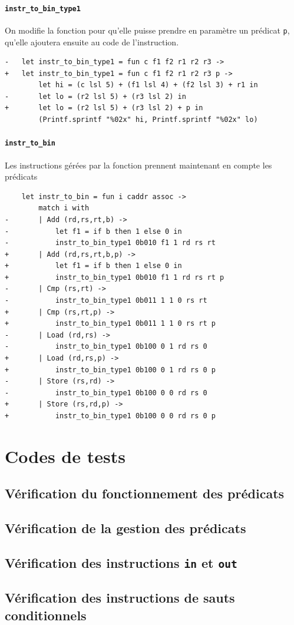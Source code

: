 \documentclass[11pt, a4paper, twoside, titlepage]{article}
\begin{document}
\paragraph{\texttt{instr\_to\_bin\_type1}}
On modifie la fonction pour qu'elle puisse prendre en paramètre un prédicat \texttt{p}, qu'elle ajoutera ensuite au code de l'instruction.
\begin{lstlisting}
-	let instr_to_bin_type1 = fun c f1 f2 r1 r2 r3 ->
+	let instr_to_bin_type1 = fun c f1 f2 r1 r2 r3 p ->
		let hi = (c lsl 5) + (f1 lsl 4) + (f2 lsl 3) + r1 in
-		let lo = (r2 lsl 5) + (r3 lsl 2) in
+		let lo = (r2 lsl 5) + (r3 lsl 2) + p in
		(Printf.sprintf "%02x" hi, Printf.sprintf "%02x" lo)
\end{lstlisting}
\paragraph{\texttt{instr\_to\_bin}}
Les instructions gérées par la fonction prennent maintenant en compte les prédicats
\begin{lstlisting}
	let instr_to_bin = fun i caddr assoc ->
		match i with
-		| Add (rd,rs,rt,b) ->
-			let f1 = if b then 1 else 0 in
-			instr_to_bin_type1 0b010 f1 1 rd rs rt
+		| Add (rd,rs,rt,b,p) ->
+			let f1 = if b then 1 else 0 in
+			instr_to_bin_type1 0b010 f1 1 rd rs rt p
-		| Cmp (rs,rt) ->
-			instr_to_bin_type1 0b011 1 1 0 rs rt
+		| Cmp (rs,rt,p) ->
+			instr_to_bin_type1 0b011 1 1 0 rs rt p
-		| Load (rd,rs) ->
-			instr_to_bin_type1 0b100 0 1 rd rs 0
+		| Load (rd,rs,p) ->
+			instr_to_bin_type1 0b100 0 1 rd rs 0 p
-		| Store (rs,rd) ->
-			instr_to_bin_type1 0b100 0 0 rd rs 0
+		| Store (rs,rd,p) ->
+			instr_to_bin_type1 0b100 0 0 rd rs 0 p
\end{lstlisting}

\section{Codes de tests}

\subsection{Vérification du fonctionnement des prédicats}


\subsection{Vérification de la gestion des prédicats}


\subsection{Vérification des instructions \texttt{in} et \texttt{out}}


\subsection{Vérification des instructions de sauts conditionnels}

\end{document}
